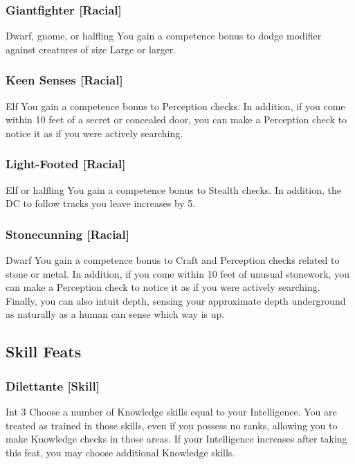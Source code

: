 \subsubsection{Giantfighter [Racial]}
 Dwarf, gnome, or halfling
 You gain a  competence bonus to dodge modifier against creatures of size Large or larger.

\subsubsection{Keen Senses [Racial]}
 Elf
 You gain a  competence bonus to Perception checks. In addition, if you come within 10 feet of a secret or concealed door, you can make a Perception check to notice it as if you were actively searching.

\subsubsection{Light-Footed [Racial]}
 Elf or halfling
 You gain a  competence bonus to Stealth checks. In addition, the DC to follow tracks you leave increases by 5.

\subsubsection{Stonecunning [Racial]}
 Dwarf
 You gain a  competence bonus to Craft and Perception checks related to stone or metal. In addition, if you come within 10 feet of unusual stonework, you can make a Perception check to notice it as if you were actively searching. Finally, you can also intuit depth, sensing your approximate depth underground as naturally as a human can sense which way is up.

\subsection{Skill Feats}

\subsubsection{Dilettante [Skill]}
 Int 3
 Choose a number of Knowledge skills equal to your Intelligence. You are treated as trained in those skills, even if you possess no ranks, allowing you to make Knowledge checks in those areas. If your Intelligence increases after taking this feat, you may choose additional Knowledge skills.


